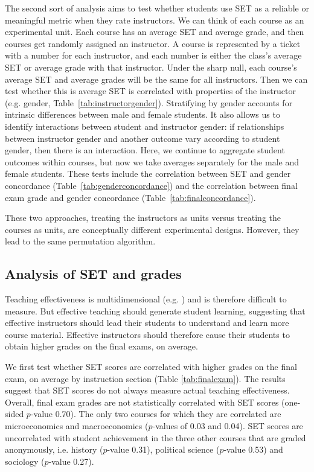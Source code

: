 \documentclass[12pt]{article}
\begin{document}
The second sort of analysis aims to test whether students use SET as a reliable or meaningful metric when they rate instructors.  We can think of each course as an experimental unit.  Each course has an average SET and average grade, and then courses get randomly assigned an instructor.  A course is represented by a ticket with a number for each instructor, and each number is either the class's average SET or average grade with that instructor.  Under the sharp null, each course's average SET and average grades will be the same for all instructors.  Then we can test whether this is average SET is correlated with properties of the instructor (e.g. gender, Table~\ref{tab:instructorgender}).  Stratifying by gender accounts for intrinsic differences between male and female students.  It also allows us to identify interactions between student and instructor gender: if relationships between instructor gender and another outcome vary according to student gender, then there is an interaction.  Here, we continue to aggregate student outcomes within courses, but now we take averages separately for the male and female students.  These tests include the correlation between SET and gender concordance (Table~\ref{tab:genderconcordance}) and the correlation between final exam grade and gender concordance (Table~\ref{tab:finalconcordance}).

These two approaches, treating the instructors as units versus treating the courses as units, are conceptually different experimental designs.  However, they lead to the same permutation algorithm.


\subsection{Analysis of SET and grades}

Teaching effectiveness is multidimensional (e.g. \citet{Marsh1997}) and is therefore difficult to measure. But effective teaching should generate student learning, suggesting that effective instructors should lead their students to understand and learn more course material. Effective instructors should therefore cause their students to obtain higher grades on the final exams, on average. 

We first test whether SET scores are correlated with higher grades on the final exam, on average by instruction section (Table \ref{tab:finalexam}). The results suggest that SET scores do not always measure actual teaching effectiveness. Overall, final exam grades are not statistically correlated with SET scores (one-sided $p$-value 0.70). The only two courses for which they are correlated are microeconomics and macroeconomics ($p$-values of 0.03 and 0.04). SET scores are uncorrelated with student achievement in the three other courses that are graded anonymously, i.e. history ($p$-value 0.31), political science ($p$-value 0.53) and sociology ($p$-value 0.27). 
\end{document}
